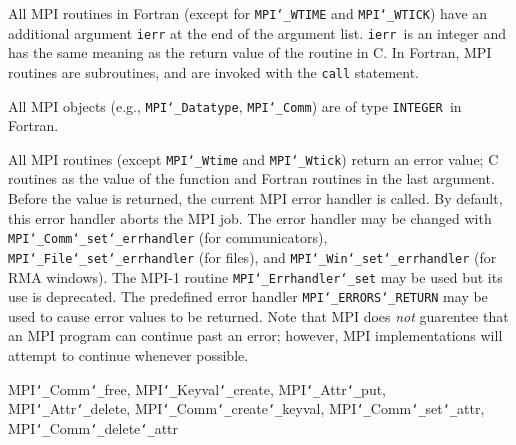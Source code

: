 \par
{}
All MPI routines in Fortran (except for {\tt MPI{\tt \char`\_}WTIME} and {\tt MPI{\tt \char`\_}WTICK}) have
an additional argument {\tt ierr} at the end of the argument list.  {\tt ierr
}is an integer and has the same meaning as the return value of the routine
in C.  In Fortran, MPI routines are subroutines, and are invoked with the
{\tt call} statement.
\par
All MPI objects (e.g., {\tt MPI{\tt \char`\_}Datatype}, {\tt MPI{\tt \char`\_}Comm}) are of type {\tt INTEGER
}in Fortran.
\par
{}
\par
All MPI routines (except {\tt MPI{\tt \char`\_}Wtime} and {\tt MPI{\tt \char`\_}Wtick}) return an error value;
C routines as the value of the function and Fortran routines in the last
argument.  Before the value is returned, the current MPI error handler is
called.  By default, this error handler aborts the MPI job.  The error handler
may be changed with {\tt MPI{\tt \char`\_}Comm{\tt \char`\_}set{\tt \char`\_}errhandler} (for communicators),
{\tt MPI{\tt \char`\_}File{\tt \char`\_}set{\tt \char`\_}errhandler} (for files), and {\tt MPI{\tt \char`\_}Win{\tt \char`\_}set{\tt \char`\_}errhandler} (for
RMA windows).  The MPI-1 routine {\tt MPI{\tt \char`\_}Errhandler{\tt \char`\_}set} may be used but
its use is deprecated.  The predefined error handler
{\tt MPI{\tt \char`\_}ERRORS{\tt \char`\_}RETURN} may be used to cause error values to be returned.
Note that MPI does {\em not} guarentee that an MPI program can continue past
an error; however, MPI implementations will attempt to continue whenever
possible.
\par
{}
\par
{}
 MPI{\tt \char`\_}Comm{\tt \char`\_}free, MPI{\tt \char`\_}Keyval{\tt \char`\_}create, MPI{\tt \char`\_}Attr{\tt \char`\_}put, MPI{\tt \char`\_}Attr{\tt \char`\_}delete,
\nextline
MPI{\tt \char`\_}Comm{\tt \char`\_}create{\tt \char`\_}keyval, MPI{\tt \char`\_}Comm{\tt \char`\_}set{\tt \char`\_}attr, MPI{\tt \char`\_}Comm{\tt \char`\_}delete{\tt \char`\_}attr
\endmanpage
